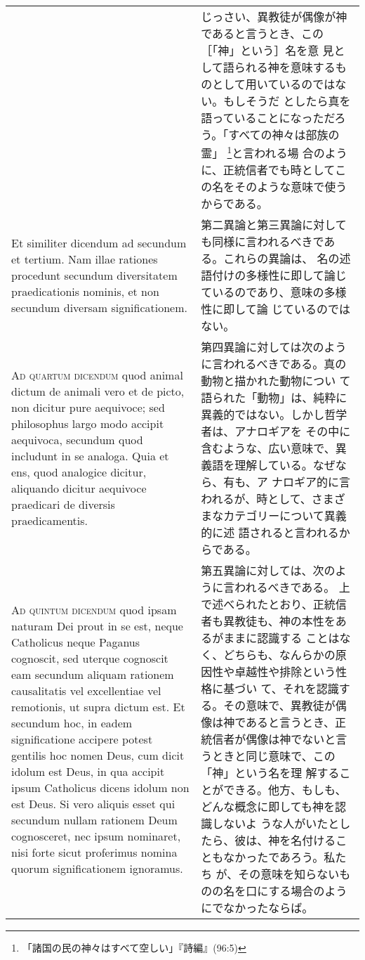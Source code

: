 \documentclass[10pt]{jsarticle} %
\begin{document}
\begin{longtable}{p{21em}p{21em}}
& 


じっさい、異教徒が偶像が神であると言うとき、この［「神」という］名を意
見として語られる神を意味するものとして用いているのではない。もしそうだ
としたら真を語っていることになっただろう。「すべての神々は部族の霊」
\footnote{「諸国の民の神々はすべて空しい」『詩編』(96:5)}と言われる場
合のように、正統信者でも時としてこの名をそのような意味で使うからである。


\\


Et similiter dicendum ad secundum et
tertium. Nam illae rationes procedunt secundum diversitatem
praedicationis nominis, et non secundum diversam significationem.

&

第二異論と第三異論に対しても同様に言われるべきである。これらの異論は、
名の述語付けの多様性に即して論じているのであり、意味の多様性に即して論
じているのではない。

\\


{\scshape Ad quartum dicendum} quod animal dictum de
animali vero et de picto, non dicitur pure aequivoce; sed philosophus
largo modo accipit aequivoca, secundum quod includunt in se
analoga. Quia et ens, quod analogice dicitur, aliquando dicitur
aequivoce praedicari de diversis praedicamentis.

&

第四異論に対しては次のように言われるべきである。真の動物と描かれた動物につい
て語られた「動物」は、純粋に異義的ではない。しかし哲学者は、アナロギアを
その中に含むような、広い意味で、異義語を理解している。なぜなら、有も、ア
ナロギア的に言われるが、時として、さまざまなカテゴリーについて異義的に述
語されると言われるからである。

\\


{\scshape Ad quintum dicendum} quod ipsam naturam Dei
prout in se est, neque Catholicus neque Paganus cognoscit, sed uterque
cognoscit eam secundum aliquam rationem causalitatis vel excellentiae
vel remotionis, ut supra dictum est. Et secundum hoc, in eadem
significatione accipere potest gentilis hoc nomen Deus, cum dicit idolum
est Deus, in qua accipit ipsum Catholicus dicens idolum non est Deus. Si
vero aliquis esset qui secundum nullam rationem Deum cognosceret, nec
ipsum nominaret, nisi forte sicut proferimus nomina quorum
significationem ignoramus.

&

第五異論に対しては、次のように言われるべきである。
上で述べられたとおり、正統信者も異教徒も、神の本性をあるがままに認識する
 ことはなく、どちらも、なんらかの原因性や卓越性や排除という性格に基づい
 て、それを認識する。その意味で、異教徒が偶像は神であると言うとき、正
 統信者が偶像は神でないと言うときと同じ意味で、この「神」という名を理
 解することができる。他方、もしも、どんな概念に即しても神を認識しないよ
 うな人がいたとしたら、彼は、神を名付けることもなかったであろう。私たち
 が、その意味を知らないものの名を口にする場合のようにでなかったならば。

\end{longtable}
\newpage
{}
\end{document}
